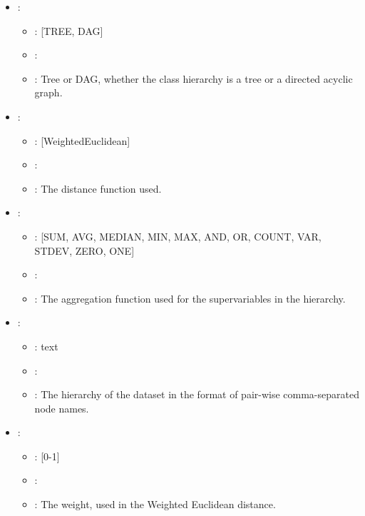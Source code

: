 \begin{itemize}
    \item {}:
           \begin{itemize}
                \item \optionPossibleValues{}: [TREE, DAG]
                \item \optionDefaultValue{}: \optionDefaultValueStyle{}
                \item \optionDescrption{}: Tree or DAG, whether the class hierarchy is a tree or a directed acyclic graph.
           \end{itemize}
    \item {}:
           \begin{itemize}
                \item \optionPossibleValues{}: [WeightedEuclidean]
                \item \optionDefaultValue{}: \optionDefaultValueStyle{}
                \item \optionDescrption{}: The distance function used.
           \end{itemize}
    \item {}:
           \begin{itemize}
                \item \optionPossibleValues{}: [SUM, AVG, MEDIAN, MIN, MAX, AND, OR, COUNT, VAR, STDEV, ZERO, ONE]
                \item \optionDefaultValue{}: \optionDefaultValueStyle{}
                \item \optionDescrption{}: The aggregation function used for the supervariables in the hierarchy.
           \end{itemize}
    \item {}:
           \begin{itemize}
                \item \optionPossibleValues{}: text
                \item \optionDefaultValue{}: \optionDefaultValueStyle{}
                \item \optionDescrption{}: The hierarchy of the dataset in the format of pair-wise comma-separated node names.
           \end{itemize}
    \item {}:
           \begin{itemize}
                \item \optionPossibleValues{}: [0-1]
                \item \optionDefaultValue{}: \optionDefaultValueStyle{}
                \item \optionDescrption{}: The weight, used in the Weighted Euclidean distance.
           \end{itemize}
\end{itemize}
